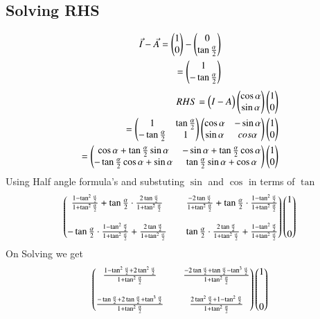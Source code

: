\documentclass[journal,12pt,onecolumn]{IEEEtran}
\begin{document}
\subsection{Solving RHS}
\begin{align}
   \Vec{I}-\Vec{A}=\begin{pmatrix}1 \\ 0\end{pmatrix}-\begin{pmatrix}0 \\ \tan\frac{\alpha}{2} \end{pmatrix}\\
   =\begin{pmatrix}1 \\ -\tan\frac{\alpha}{2} \end{pmatrix}
\end{align}
\begin{align}
 RHS=\begin{pmatrix}I-A\end{pmatrix}\begin{pmatrix}\cos\alpha \\ \sin\alpha\end{pmatrix}\begin{pmatrix}1\\0\end{pmatrix}\\
 =\begin{pmatrix}1 &  \tan\frac{\alpha}{2} \\ -\tan\frac{\alpha}{2} & 1 \end{pmatrix}\begin{pmatrix}\cos\alpha & -\sin\alpha \\ \sin\alpha & cos\alpha\end{pmatrix}\begin{pmatrix}1 \\ 0\end{pmatrix}\\
 =\begin{pmatrix}\cos\alpha+\tan\frac{\alpha}{2}\sin\alpha & -\sin\alpha+\tan\frac{\alpha}{2}\cos\alpha \\ -\tan\frac{\alpha}{2}\cos\alpha+\sin\alpha & \tan\frac{\alpha}{2}\sin\alpha+\cos\alpha\end{pmatrix}\begin{pmatrix}1\\0\end{pmatrix}
\end{align}
Using Half angle formula's and substuting $\sin$ and $\cos$ in terms of $\tan$
\begin{align}
    \begin{pmatrix}\frac{1-\tan^2\frac{\alpha}{2}}{1+\tan^2\frac{\alpha}{2}}+\tan\frac{\alpha}{2}\cdot\frac{2\tan\frac{\alpha}{2}}{1+\tan^2\frac{\alpha}{2}} && \frac{-2\tan\frac{\alpha}{2}}{1+\tan^2\frac{\alpha}{2}}+\tan\frac{\alpha}{2}\cdot\frac{1-\tan^2\frac{\alpha}{2}}{1+\tan^2\frac{\alpha}{2}}\\ \\ -\tan\frac{\alpha}{2}\cdot\frac{1-\tan^2\frac{\alpha}{2}}{1+\tan^2\frac{\alpha}{2} }+\frac{2\tan\frac{\alpha}{2}}{1+\tan^2\frac{\alpha}{2}} && \tan\frac{\alpha}{2}\cdot\frac{2\tan\frac{\alpha}{2}}{1+\tan^2\frac{\alpha}{2}}+\frac{1-\tan^2\frac{\alpha}{2}}{1+\tan^2\frac{\alpha}{2}}\end{pmatrix}\begin{pmatrix}1 \\ \\ \\0\end{pmatrix}
\end{align}
On Solving we get
\begin{align}
    \begin{pmatrix}\frac{1-\tan^2\frac{\alpha}{2}+2\tan^2\frac{\alpha}{2}}{1+\tan^2\frac{\alpha}{2}} && \frac{-2\tan\frac{\alpha}{2}+\tan\frac{\alpha}{2}-\tan^3\frac{\alpha}{2}}{1+\tan^2\frac{\alpha}{2}} \\ \\ \frac{-\tan\frac{\alpha}{2}+2\tan\frac{\alpha}{2}+\tan^3\frac{\alpha}{2}}{1+\tan^2\frac{\alpha}{2}} && \frac{2\tan^2\frac{\alpha}{2}+1-\tan^2\frac{\alpha}{2}}{1+\tan^2\frac{\alpha}{2}}\end{pmatrix}\begin{pmatrix}1 \\ \\ \\ 0\end{pmatrix}
\end{align}
\end{document}
